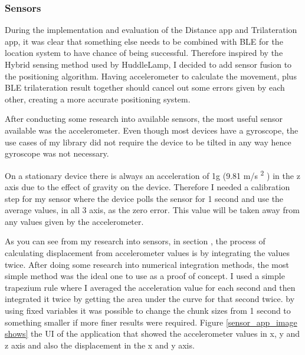 \subsubsection{Sensors} \label{nocamera_sensors}
During the implementation and evaluation of the Distance app and Trilateration app, it was clear that something else needs to be combined with BLE for the location system to have chance of being successful. Therefore inspired by the Hybrid sensing method used by HuddleLamp, I decided to add sensor fusion to the positioning algorithm. Having accelerometer to calculate the movement, plus BLE trilateration result together should cancel out some errors given by each other, creating a more accurate positioning system.

After conducting some research into available sensors, the most useful sensor available was the accelerometer. Even though most devices have a gyroscope, the use cases of my library did not require the device to be tilted in any way hence gyroscope was not necessary. 

On a stationary device there is always an acceleration of 1g (9.81 m/s \textsuperscript{2} )
in the z axis due to the effect of gravity on the device. Therefore I needed a calibration step for my sensor where the device polls the sensor for 1 second and use the average values, in all 3 axis, as the zero error. This value will be taken away from any values given by the accelerometer.

As you can see from my research into sensors, in section , the process of calculating displacement from accelerometer values is by integrating the values twice. After doing some research into numerical integration methods, the most simple method was the ideal one to use as a proof of concept. I used a simple trapezium rule where I averaged the acceleration value for each second and then integrated it twice by getting the area under the curve for that second twice. by using fixed variables it was possible to change the chunk sizes from 1 second to something smaller if more finer results were required.
Figure \ref{sensor_app_image shows} the UI of the application that showed the accelerometer values in x, y and z axis and also the displacement in the x and y axis.

